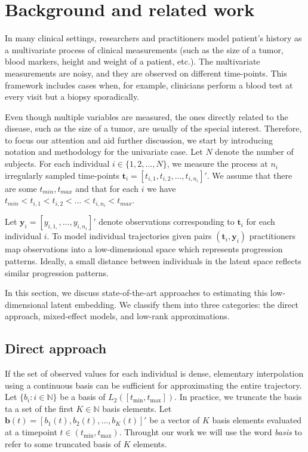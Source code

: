 \documentclass[preprint]{imsart}
\numberwithin{equation}{section}
\theoremstyle{plain}
\newcommand{\N}{\mathbb{N}}
\newcommand{\bt}{\mathbf{t}}
\newcommand{\by}{\mathbf{y}}
\newcommand{\bb}{\mathbf{b}}
\begin{document}
\section{Background and related work}\label{s:background}

In many clinical settings, researchers and practitioners model patient's history as a multivariate process of clinical measurements (such as the size of a tumor, blood markers, height and weight of a patient, etc.). The multivariate measurements are noisy, and they are observed on different time-points. This framework includes cases when, for example, clinicians perform a blood test at every visit but a biopsy sporadically. 

Even though multiple variables are measured, the ones directly related to the disease, such as the size of a tumor, are usually of the special interest. Therefore, to focus our attention and aid further discussion, we start by introducing notation and methodology for the univariate case. Let $N$ denote the number of subjects. For each individual $i \in \{ 1,2,...,N \}$, we measure the process at $n_i$ irregularly sampled time-points $\mathbf{t}_i = [t_{i,1},t_{i,2},...,t_{i,n_i}]'$. We assume that there are some $t_{min},t_{max}$ and that for each $i$ we have $t_{min} < t_{i,1} < t_{i,2} < ... < t_{i,n_i} < t_{max}$.

Let $\by_i = [y_{i,1,},...,y_{i,n_i}]'$ denote observations corresponding to $\bt_i$ for each individual $i$. To model individual trajectories given pairs $(\mathbf{t}_i,\mathbf{y}_i)$ practitioners map observations into a low-dimensional space which represents progression patterns. Ideally, a small distance between individuals in the latent space reflects similar progression patterns.

In this section, we discuss state-of-the-art approaches to estimating this low-dimensional latent embedding. We classify them into three categories: the direct approach, mixed-effect models, and low-rank approximations. 

\subsection{Direct approach}\label{ss:direct}

If the set of observed values for each individual is dense, elementary interpolation using a continuous basis can be sufficient for approximating the entire trajectory. Let $\{b_i: i \in \N \}$ be a basis of $L_2([t_{\min},t_{\max}])$. In practice, we truncate the basis ta a set of the first $K \in \N$ basis elements. Let $\bb(t) = [b_1(t),b_2(t),...,b_K(t)]'$ be a vector of $K$ basis elements evaluated at a timepoint $t \in (t_{\min},t_{\max})$. Throught our work we will use the word \emph{basis} to refer to some truncated basis of $K$ elements.
\end{document}
